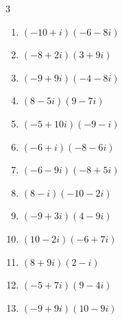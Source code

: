 \begin{multicols}{3}
\begin{enumerate}
  \item $\displaystyle (-10+i)(-6-8i)$

        \phantom{$\displaystyle =68+74i$}

  \item $\displaystyle (-8+2i)(3+9i)$

        \phantom{$\displaystyle =-42-66i$}

  \item $\displaystyle (-9+9i)(-4-8i)$

        \phantom{$\displaystyle =108+36i$}

  \item $\displaystyle (8-5i)(9-7i)$

        \phantom{$\displaystyle =37-101i$}

  \item $\displaystyle (-5+10i)(-9-i)$

        \phantom{$\displaystyle =55-85i$}

  \item $\displaystyle (-6+i)(-8-6i)$

        \phantom{$\displaystyle =54+28i$}

  \item $\displaystyle (-6-9i)(-8+5i)$

        \phantom{$\displaystyle =93+42i$}

  \item $\displaystyle (8-i)(-10-2i)$

        \phantom{$\displaystyle =-82-6i$}

  \item $\displaystyle (-9+3i)(4-9i)$

        \phantom{$\displaystyle =-9+93i$}

  \item $\displaystyle (10-2i)(-6+7i)$

        \phantom{$\displaystyle =-46+82i$}

  \item $\displaystyle (8+9i)(2-i)$

        \phantom{$\displaystyle =25+10i$}

  \item $\displaystyle (-5+7i)(9-4i)$

        \phantom{$\displaystyle =-17+83i$}

  \item $\displaystyle (-9+9i)(10-9i)$

        \phantom{$\displaystyle =-9+171i$}


\end{enumerate}
\end{multicols}
